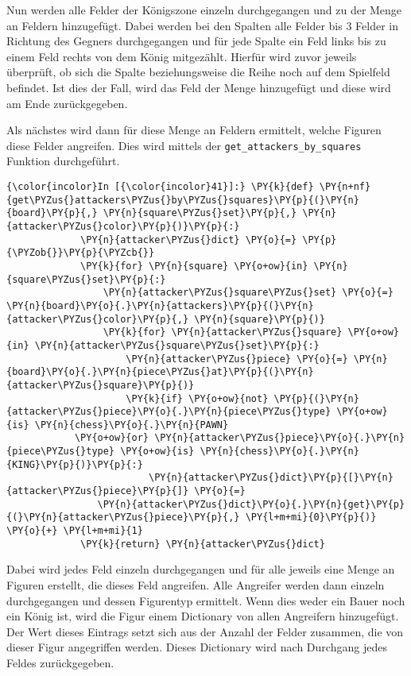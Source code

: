     Nun werden alle Felder der Königszone einzeln durchgegangen und zu der
Menge an Feldern hinzugefügt. Dabei werden bei den Spalten alle Felder
bis 3 Felder in Richtung des Gegners durchgegangen und für jede Spalte
ein Feld links bis zu einem Feld rechts von dem König mitgezählt. Hierfür
wird zuvor jeweils überprüft, ob sich die Spalte beziehungsweise die
Reihe noch auf dem Spielfeld befindet. Ist dies der Fall, wird das Feld
der Menge hinzugefügt und diese wird am Ende zurückgegeben.

Als nächstes wird dann für diese Menge an Feldern ermittelt, welche
Figuren diese Felder angreifen. Dies wird mittels der
\texttt{get\_attackers\_by\_squares} Funktion durchgeführt.

        \begin{Verbatim}[commandchars=\\\{\}]
{\color{incolor}In [{\color{incolor}41}]:} \PY{k}{def} \PY{n+nf}{get\PYZus{}attackers\PYZus{}by\PYZus{}squares}\PY{p}{(}\PY{n}{board}\PY{p}{,} \PY{n}{square\PYZus{}set}\PY{p}{,} \PY{n}{attacker\PYZus{}color}\PY{p}{)}\PY{p}{:}
             \PY{n}{attacker\PYZus{}dict} \PY{o}{=} \PY{p}{\PYZob{}}\PY{p}{\PYZcb{}}
             \PY{k}{for} \PY{n}{square} \PY{o+ow}{in} \PY{n}{square\PYZus{}set}\PY{p}{:}
                 \PY{n}{attacker\PYZus{}square\PYZus{}set} \PY{o}{=} \PY{n}{board}\PY{o}{.}\PY{n}{attackers}\PY{p}{(}\PY{n}{attacker\PYZus{}color}\PY{p}{,} \PY{n}{square}\PY{p}{)}
                 \PY{k}{for} \PY{n}{attacker\PYZus{}square} \PY{o+ow}{in} \PY{n}{attacker\PYZus{}square\PYZus{}set}\PY{p}{:}
                     \PY{n}{attacker\PYZus{}piece} \PY{o}{=} \PY{n}{board}\PY{o}{.}\PY{n}{piece\PYZus{}at}\PY{p}{(}\PY{n}{attacker\PYZus{}square}\PY{p}{)}
                     \PY{k}{if} \PY{o+ow}{not} \PY{p}{(}\PY{n}{attacker\PYZus{}piece}\PY{o}{.}\PY{n}{piece\PYZus{}type} \PY{o+ow}{is} \PY{n}{chess}\PY{o}{.}\PY{n}{PAWN} 
			\PY{o+ow}{or} \PY{n}{attacker\PYZus{}piece}\PY{o}{.}\PY{n}{piece\PYZus{}type} \PY{o+ow}{is} \PY{n}{chess}\PY{o}{.}\PY{n}{KING}\PY{p}{)}\PY{p}{:}
                         \PY{n}{attacker\PYZus{}dict}\PY{p}{[}\PY{n}{attacker\PYZus{}piece}\PY{p}{]} \PY{o}{=} 
				\PY{n}{attacker\PYZus{}dict}\PY{o}{.}\PY{n}{get}\PY{p}{(}\PY{n}{attacker\PYZus{}piece}\PY{p}{,} \PY{l+m+mi}{0}\PY{p}{)} \PY{o}{+} \PY{l+m+mi}{1}
             \PY{k}{return} \PY{n}{attacker\PYZus{}dict}
\end{Verbatim}

    Dabei wird jedes Feld einzeln durchgegangen und für alle jeweils eine
Menge an Figuren erstellt, die dieses Feld angreifen. Alle Angreifer
werden dann einzeln durchgegangen und dessen Figurentyp ermittelt. Wenn
dies weder ein Bauer noch ein König ist, wird die Figur einem Dictionary
von allen Angreifern hinzugefügt. Der Wert dieses Eintrags setzt sich
aus der Anzahl der Felder zusammen, die von dieser Figur angegriffen
werden. Dieses Dictionary wird nach Durchgang jedes Feldes
zurückgegeben.


